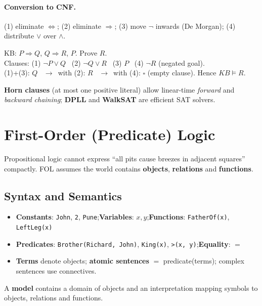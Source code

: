 \paragraph{Conversion to CNF.} (1) eliminate $\Leftrightarrow$; (2) eliminate $\Rightarrow$; (3) move $\neg$ inwards (De Morgan); (4) distribute $\vee$ over $\wedge$.
\begin{example}
KB: $P\Rightarrow Q$, $Q\Rightarrow R$, $P$. Prove $R$.\\
Clauses: (1) $\neg P\vee Q$ \ (2) $\neg Q\vee R$ \ (3) $P$ \ (4) $\neg R$ (negated goal).\\
(1)+(3): $Q$ \ $\to$\ with (2): $R$ \ $\to$\ with (4): $\square$ (empty clause). Hence $KB\models R$.
\end{example}
\textbf{Horn clauses} (at most one positive literal) allow linear-time \emph{forward} and \emph{backward chaining}; \textbf{DPLL} and \textbf{WalkSAT} are efficient SAT solvers.

\section{First-Order (Predicate) Logic}
Propositional logic cannot express ``all pits cause breezes in adjacent squares'' compactly. FOL assumes the world contains \textbf{objects}, \textbf{relations} and \textbf{functions}.
\subsection{Syntax and Semantics}
\begin{itemize}
\item \textbf{Constants}: \texttt{John}, \texttt{2}, \texttt{Pune};\quad \textbf{Variables}: $x,y$;\quad \textbf{Functions}: \texttt{FatherOf(x)}, \texttt{LeftLeg(x)}
\item \textbf{Predicates}: \texttt{Brother(Richard, John)}, \texttt{King(x)}, \texttt{>(x, y)};\quad \textbf{Equality}: $=$
\item \textbf{Terms} denote objects; \textbf{atomic sentences} $=$ predicate(terms); complex sentences use connectives.
\end{itemize}
A \textbf{model} contains a domain of objects and an interpretation mapping symbols to objects, relations and functions.
